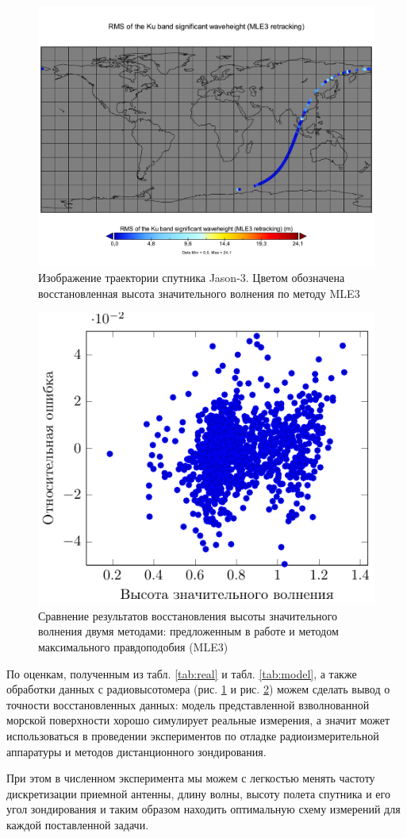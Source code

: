\begin{figure}[H]
    \centering
    \includegraphics[width=\linewidth]{img/swh_rms_ku_mle3}
    \caption{Изображение траектории спутника Jason-3. Цветом
    обозначена восстановленная высота значительного волнения по методу MLE3}
    \label{fig:mle3}
\end{figure}
\begin{figure}[H]
    \centering
    \includegraphics[width=0.6\linewidth]{fig/retracking/compare}
    \caption{Сравнение результатов восстановления высоты значительного волнения
    двумя методами: предложенным в работе и методом максимального правдоподобия
(MLE3)}
    \label{fig:mle3_compare}
\end{figure}


По оценкам, полученным из табл. \ref{tab:real} и табл. \ref{tab:model}, а также
обработки данных  с радиовысотомера (рис. \ref{fig:mle3} и рис. \ref{fig:mle3_compare})
можем сделать вывод о точности восстановленных данных: модель представленной
взволнованной морской поверхности хорошо симулирует реальные измерения, а
значит может использоваться в проведении экспериментов по отладке
радиоизмерительной аппаратуры и методов дистанционного зондирования. 

При этом в численном эксперимента мы можем с легкостью менять частоту
дискретизации приемной антенны, длину волны, высоту полета спутника и его угол
зондирования и таким образом находить оптимальную схему измерений для каждой
поставленной задачи.

